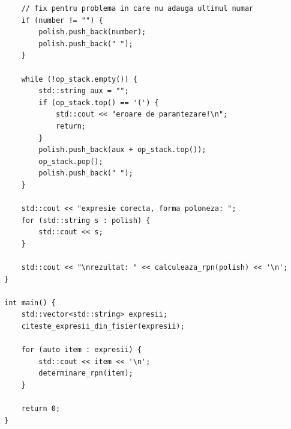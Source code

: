 \documentclass[12pt]{book}
\begin{document}
\begin{lstlisting}
    // fix pentru problema in care nu adauga ultimul numar
    if (number != "") {
        polish.push_back(number);
        polish.push_back(" ");
    }

    while (!op_stack.empty()) {
        std::string aux = "";
        if (op_stack.top() == '(') {
            std::cout << "eroare de parantezare!\n";
            return;
        }
        polish.push_back(aux + op_stack.top());
        op_stack.pop();
        polish.push_back(" ");
    }

    std::cout << "expresie corecta, forma poloneza: ";
    for (std::string s : polish) {
        std::cout << s;
    }

    std::cout << "\nrezultat: " << calculeaza_rpn(polish) << '\n';
}

int main() {
    std::vector<std::string> expresii;
    citeste_expresii_din_fisier(expresii);

    for (auto item : expresii) {
        std::cout << item << '\n';
        determinare_rpn(item);
    }

    return 0;
}
\end{lstlisting}

\newpage
\end{document}
